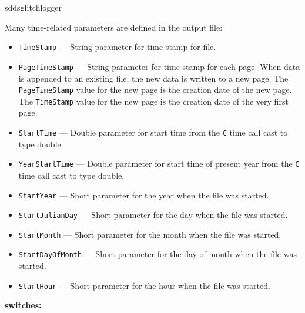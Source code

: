 \begin{sddsprog}{sddsglitchlogger}
\begin{itemize}
Many time-related parameters are defined in the output file:
  \begin{itemize}
    \item {\tt TimeStamp} --- String parameter for time stamp for file.
    \item {\tt PageTimeStamp} --- String parameter for time stamp for each page. When data
                is appended to an existing file, the new data is written to a new
                page. The {\tt PageTimeStamp} value for the new page is the creation
                date of the new page. The {\tt TimeStamp} value for the new page is the creation
                date of the very first page.
    \item {\tt StartTime} --- Double parameter for start time from the {\tt C} time call cast to type double.
    \item {\tt YearStartTime} --- Double parameter for start time of present year from the {\tt C} time call cast to type double.
    \item {\verb+StartYear+} --- Short parameter for the year when the file was started.
    \item {\verb+StartJulianDay+} --- Short parameter for the day when the file was started.
    \item {\verb+StartMonth+} --- Short parameter for the month when the file was started.
    \item {\verb+StartDayOfMonth+} --- Short parameter for the day of month when the file was started.
    \item {\verb+StartHour+} --- Short parameter for the hour when the file was started.
  \end{itemize}
\end{itemize}

\item \textbf{switches:}
\begin{itemize}


\end{itemize}
\end{sddsprog}
